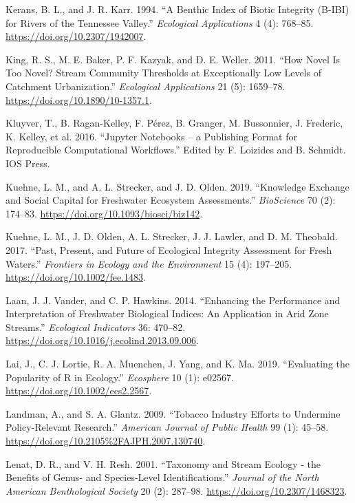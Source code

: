 \documentclass[fleqn,10pt,lineno]{wlpeerj} %
\begin{document}
\leavevmode\hypertarget{ref-Kerans94}{}%
Kerans, B. L., and J. R. Karr. 1994. ``A Benthic Index of Biotic Integrity (B-IBI) for Rivers of the Tennessee Valley.'' \emph{Ecological Applications} 4 (4): 768--85. \url{https://doi.org/10.2307/1942007}.

\leavevmode\hypertarget{ref-King11}{}%
King, R. S., M. E. Baker, P. F. Kazyak, and D. E. Weller. 2011. ``How Novel Is Too Novel? Stream Community Thresholds at Exceptionally Low Levels of Catchment Urbanization.'' \emph{Ecological Applications} 21 (5): 1659--78. \url{https://doi.org/10.1890/10-1357.1}.

\leavevmode\hypertarget{ref-Kluyver16}{}%
Kluyver, T., B. Ragan-Kelley, F. Pérez, B. Granger, M. Bussonnier, J. Frederic, K. Kelley, et al. 2016. ``Jupyter Notebooks -- a Publishing Format for Reproducible Computational Workflows.'' Edited by F. Loizides and B. Schmidt. IOS Press.

\leavevmode\hypertarget{ref-Kuehne19}{}%
Kuehne, L. M., and A. L. Strecker, and J. D. Olden. 2019. ``Knowledge Exchange and Social Capital for Freshwater Ecosystem Assessments.'' \emph{BioScience} 70 (2): 174--83. \url{https://doi.org/10.1093/biosci/biz142}.

\leavevmode\hypertarget{ref-Kuehne17}{}%
Kuehne, L. M., J. D. Olden, A. L. Strecker, J. J. Lawler, and D. M. Theobald. 2017. ``Past, Present, and Future of Ecological Integrity Assessment for Fresh Waters.'' \emph{Frontiers in Ecology and the Environment} 15 (4): 197--205. \url{https://doi.org/10.1002/fee.1483}.

\leavevmode\hypertarget{ref-VanderLaan14}{}%
Laan, J. J. Vander, and C. P. Hawkins. 2014. ``Enhancing the Performance and Interpretation of Freshwater Biological Indices: An Application in Arid Zone Streams.'' \emph{Ecological Indicators} 36: 470--82. \url{https://doi.org/10.1016/j.ecolind.2013.09.006}.

\leavevmode\hypertarget{ref-Lai19}{}%
Lai, J., C. J. Lortie, R. A. Muenchen, J. Yang, and K. Ma. 2019. ``Evaluating the Popularity of R in Ecology.'' \emph{Ecosphere} 10 (1): e02567. \url{https://doi.org/10.1002/ecs2.2567}.

\leavevmode\hypertarget{ref-Landman09}{}%
Landman, A., and S. A. Glantz. 2009. ``Tobacco Industry Efforts to Undermine Policy-Relevant Research.'' \emph{American Journal of Public Health} 99 (1): 45--58. \url{https://doi.org/10.2105\%2FAJPH.2007.130740}.

\leavevmode\hypertarget{ref-Lenat01}{}%
Lenat, D. R., and V. H. Resh. 2001. ``Taxonomy and Stream Ecology - the Benefits of Genus- and Species-Level Identifications.'' \emph{Journal of the North American Benthological Society} 20 (2): 287--98. \url{https://doi.org/10.2307/1468323}.
\end{document}

